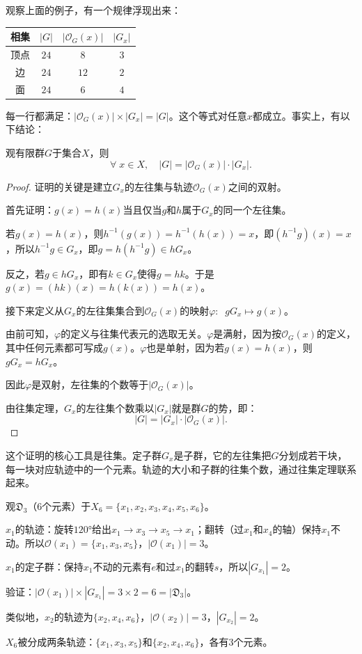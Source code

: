 \documentclass[12pt,UTF8,fontset=none]{ctexbook}
\begin{document}
观察上面的例子，有一个规律浮现出来：

\begin{center}
\begin{tabular}{|c|c|c|c|}
    \hline
相集 & $|G|$ & $|\mathcal{O}_G(x)|$ & $|G_x|$ \\ \hline
顶点 & $24$ & $8$ & $3$ \\
边 & $24$ & $12$ & $2$ \\
面 & $24$ & $6$ & $4$ \\
    \hline
\end{tabular}
\end{center}

每一行都满足：$|\mathcal{O}_G(x)| \times |G_x| = |G|$。这个等式对任意$x$都成立。事实上，有以下结论：
\begin{tm}[轨定定理]
观有限群$G$于集合$X$，则
\[
\forall \;x\in X,\quad |G| = |\mathcal{O}_G(x)| \cdot |G_x|.
\]
\end{tm}

\begin{proof}
证明的关键是建立$G_x$的左往集与轨迹$\mathcal{O}_G(x)$之间的双射。

首先证明：$g(x) = h(x)$当且仅当$g$和$h$属于$G_x$的同一个左往集。

若$g(x) = h(x)$，则$h^{-1}(g(x)) = h^{-1}(h(x)) = x$，即$(h^{-1}g)(x) = x$，所以$h^{-1}g \in G_x$，即$g = h(h^{-1}g) \in hG_x$。

反之，若$g \in hG_x$，即有$k\in G_x$使得$g = hk$。于是$g(x) = (hk)(x) = h(k(x)) = h(x)$。

接下来定义从$G_x$的左往集集合到$\mathcal{O}_G(x)$的映射$\varphi:\;\;gG_x \mapsto g(x)$。

由前可知，$\varphi$的定义与往集代表元的选取无关。$\varphi$是满射，因为按$\mathcal{O}_G(x)$的定义，其中任何元素都可写成$g(x)$。$\varphi$也是单射，因为若$g(x) = h(x)$，则$gG_x = hG_x$。

因此$\varphi$是双射，左往集的个数等于$|\mathcal{O}_G(x)|$。

由往集定理，$G_x$的左往集个数乘以$|G_x|$就是群$G$的势，即：
\[
|G| = |G_x|\cdot|\mathcal{O}_G(x)|.
\]
\end{proof}

这个证明的核心工具是往集。定子群$G_x$是子群，它的左往集把$G$分划成若干块，每一块对应轨迹中的一个元素。轨迹的大小和子群的往集个数，通过往集定理联系起来。

\begin{et}
观$\mathfrak{D}_3$（$6$个元素）于$X_6 = \{x_1, x_2, x_3, x_4, x_5, x_6\}$。

$x_1$的轨迹：旋转$120°$给出$x_1 \to x_3 \to x_5 \to x_1$；翻转（过$x_1$和$x_4$的轴）保持$x_1$不动。所以$\mathcal{O}(x_1) = \{x_1, x_3, x_5\}$，$|\mathcal{O}(x_1)| = 3$。

$x_1$的定子群：保持$x_1$不动的元素有$e$和过$x_1$的翻转$s$，所以$|G_{x_1}| = 2$。

验证：$|\mathcal{O}(x_1)| \times |G_{x_1}| = 3 \times 2 = 6 = |\mathfrak{D}_3|$。

类似地，$x_2$的轨迹为$\{x_2, x_4, x_6\}$，$|\mathcal{O}(x_2)| = 3$，$|G_{x_2}| = 2$。

$X_6$被分成两条轨迹：$\{x_1, x_3, x_5\}$和$\{x_2, x_4, x_6\}$，各有$3$个元素。
\end{et}
\end{document}
